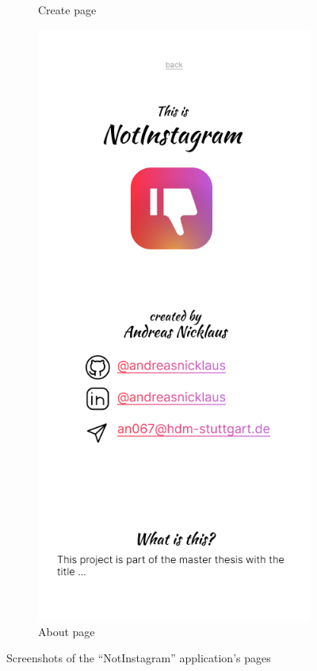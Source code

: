 \documentclass[a4paper, 12pt]{article}
\begin{document}
\begin{figure}[h]
\begin{subfigure}{0.24\linewidth}
\begin{center}
    \end{center}
    \caption{Create page}\label{subfig:create}
  \end{subfigure}
  \begin{subfigure}{0.24\linewidth}
    \begin{center}
      \includegraphics[width=\linewidth, height=0.3\textheight, keepaspectratio,frame]{img/ig-clone/Informationsseite.png}
    \end{center}
    \caption{About page}\label{subfig:about}
  \end{subfigure}
  \caption{Screenshots of the \enquote{NotInstagram} application's pages}\label{fig:screenshots}
\end{figure}
\end{document}
